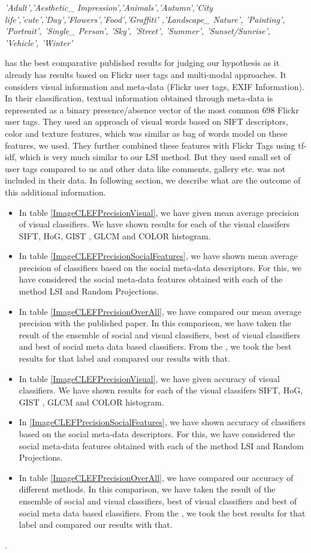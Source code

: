 \textit{'Adult','Aesthetic\_ Impression','Animals','Autumn','City life','cute','Day','Flowers','Food','Graffiti' ,'Landscape\_ Nature', 'Painting', 'Portrait', 'Single\_ Person', 'Sky', 'Street', 'Summer', 'Sunset/Sunrise', 'Vehicle', 'Winter'} 

 \citet*{CLEF} has the best comparative published results for judging our hypothesis as it already has results based on Flickr user tags and multi-modal approaches. It considers visual information and meta-data (Flickr user tags, EXIF Information). In their classification, textual information obtained through meta-data is represented as a binary presence/absence vector of the most common 698 Flickr user tags. They used an approach of visual words based on SIFT descriptors, color and texture features, which was similar as bag of words model on these features, we used. They further combined these features with Flickr Tags using tf-idf, which is very much similar to our LSI method. But they used small set of user tags compared to us and other data like comments, gallery etc. was not included in their data. In following section, we describe what are the outcome of this additional information.

\begin{itemize}
\item In table \ref{ImageCLEFPrecisionVisual}, we have given mean average precision of visual classifiers. We have shown results for each of the visual classifers SIFT, HoG, GIST , GLCM and COLOR histogram.
\item In table \ref{ImageCLEFPrecisionSocialFeatures}, we have shown mean average precision of classifiers based on the social meta-data descriptors. For this, we have considered the social meta-data features obtained with each of the method LSI and Random Projections.
\item In table \ref{ImageCLEFPrecisionOverAll}, we have compared our mean average precision with the published paper. In this comparison, we have taken the result of the ensemble of social and visual classifiers,  best of visual classifiers and best of social meta data based classifiers. From the  \citet*{CLEF}, we took the best results for that label and compared our results with that.
\item In table \ref{ImageCLEFPrecisionVisual}, we have given accuracy of visual classifiers. We have shown results for each of the visual classifers SIFT, HoG, GIST , GLCM and COLOR histogram.
\item In \ref{ImageCLEFPrecisionSocialFeatures}, we have shown accuracy of classifiers based on the social meta-data descriptors. For this, we have considered the social meta-data features obtained with each of the method LSI and Random Projections.
\item In table \ref{ImageCLEFPrecisionOverAll}, we have compared our accuracy of different methods. In this comparison, we have taken the result of the ensemble of social and visual classifiers,  best of visual classifiers and best of social meta data based classifiers. From the  \citet*{CLEF}, we took the best results for that label and compared our results with that.
\end{itemize}
.
